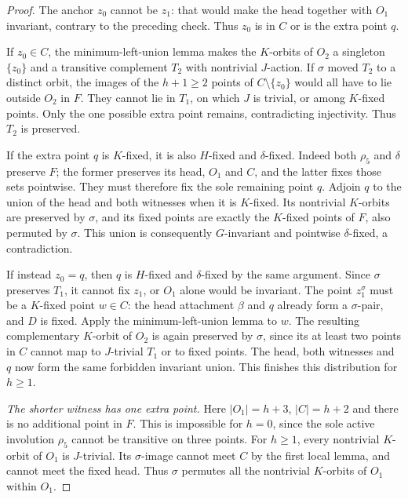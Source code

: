 \documentclass[11pt,a4paper]{article}
\begin{document}
\begin{proof}
The anchor $z_0$ cannot be $z_1$: that would
make the head together with $O_1$ invariant,
contrary to the preceding check. Thus $z_0$
is in $C$ or is the extra point $q$.

If $z_0\in C$, the minimum-left-union lemma
makes the $K$-orbits of $O_2$ a singleton
$\{z_0\}$ and a transitive complement $T_2$
with nontrivial $J$-action. If $\sigma$ moved
$T_2$ to a distinct orbit, the images of the
$h+1\ge2$ points of $C\setminus\{z_0\}$
would all have to lie outside $O_2$ in $F$.
They cannot lie in $T_1$, on which $J$ is
trivial, or among $K$-fixed points. Only the
one possible extra point remains, contradicting
injectivity. Thus $T_2$ is preserved.

If the extra point $q$ is $K$-fixed, it is
also $H$-fixed and $\delta$-fixed. Indeed both
$\rho_5$ and $\delta$ preserve $F$; the former
preserves its head, $O_1$ and $C$, and the
latter fixes those sets pointwise. They must
therefore fix the sole remaining point $q$.
Adjoin $q$ to the union of the head and both
witnesses when it is $K$-fixed. Its nontrivial
$K$-orbits are preserved by $\sigma$, and its
fixed points are exactly the $K$-fixed points
of $F$, also permuted by $\sigma$. This union
is consequently $G$-invariant and pointwise
$\delta$-fixed, a contradiction.

If instead $z_0=q$, then $q$ is $H$-fixed
and $\delta$-fixed by the same argument.
Since $\sigma$ preserves $T_1$, it cannot
fix $z_1$, or $O_1$ alone would be invariant.
The point $z_1^\sigma$ must be a $K$-fixed
point $w\in C$: the head attachment $\beta$
and $q$ already form a $\sigma$-pair, and
$D$ is fixed. Apply the minimum-left-union
lemma to $w$. The resulting complementary
$K$-orbit of $O_2$ is again preserved by
$\sigma$, since its at least two points in
$C$ cannot map to $J$-trivial $T_1$ or to
fixed points. The head, both witnesses and
$q$ now form the same forbidden invariant
union. This finishes this distribution for
$h\ge1$.

\emph{The shorter witness has one extra point.}
Here $|O_1|=h+3$, $|C|=h+2$ and there is
no additional point in $F$. This is impossible
for $h=0$, since the sole active involution
$\rho_5$ cannot be transitive on three points.
For $h\ge1$, every nontrivial $K$-orbit of
$O_1$ is $J$-trivial. Its $\sigma$-image
cannot meet $C$ by the first local lemma,
and cannot meet the fixed head. Thus
$\sigma$ permutes all the nontrivial
$K$-orbits of $O_1$ within $O_1$.


\end{proof}
\end{document}
